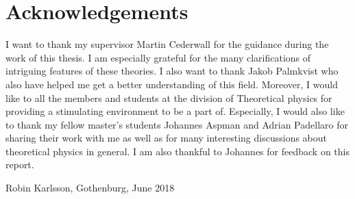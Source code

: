 \thispagestyle{plain}			%
\section*{Acknowledgements}
I want to thank my supervisor Martin Cederwall for the guidance during the work of this thesis. I am especially grateful for the many clarifications of intriguing features of these theories. I also want to thank Jakob Palmkvist who also have helped me get a better understanding of this field. Moreover, I would like to all the members and students at the division of Theoretical physics for providing a stimulating environment to be a part of. Especially, I would also like to thank my fellow master's students Johannes Aspman and Adrian Padellaro for sharing their work with me as well as for many interesting discussions about theoretical physics in general. I am also thankful to Johannes for feedback on this report.  

\vspace{1.5cm}
\hfill
Robin Karlsson, Gothenburg, June 2018

\newpage				%
\thispagestyle{empty}
\mbox{}